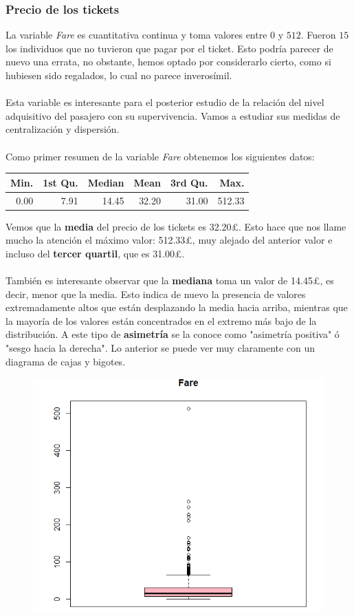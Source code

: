 \documentclass{article}
\begin{document}
\newpage
\subsubsection{Precio de los tickets}
La variable \textit{Fare} es cuantitativa continua y toma valores entre $0$ y $512$. Fueron $15$ los individuos que no tuvieron que pagar por el ticket. Esto podría parecer de nuevo una errata, no obstante, hemos optado por considerarlo cierto, como si hubiesen sido regalados, lo cual no parece inverosímil.\\\\
Esta variable es interesante para el posterior estudio de la relación del nivel adquisitivo del pasajero con su supervivencia. Vamos a estudiar sus medidas de centralización y dispersión.\\\\
Como primer resumen de la variable \textit{Fare} obtenemos los siguientes datos:

\begin{table}[ht]
\centering
\begin{tabular}{rrrrrr} 
  \hline
Min.&1st Qu.&Median& Mean&3rd Qu.&Max. \\ 
    \hline
  0.00 &7.91&14.45&32.20&31.00& 512.33  \\ 
   \hline
\end{tabular}
\end{table}

\noindent Vemos que la \textbf{media} del precio de los tickets es 32.20£. Esto hace que nos llame mucho la atención el máximo valor: 512.33£, muy alejado del anterior valor e incluso del \textbf{tercer quartil}, que es 31.00£.\\\\
También es interesante observar que la \textbf{mediana} toma un valor de 14.45£, es decir, menor que la media. Esto indica de nuevo la presencia de valores extremadamente altos que están desplazando la media hacia arriba, mientras que la mayoría de los valores están concentrados en el extremo más bajo de la distribución. A este tipo de \textbf{asimetría} se la conoce como "asimetría positiva" ó "sesgo hacia la derecha". Lo anterior se puede ver muy claramente con un diagrama de cajas y bigotes.

\begin{figure}[!h]
    \centering
    \includegraphics[width=0.7\linewidth]{content/boxplot_fare.png}
\end{figure}
\end{document}
